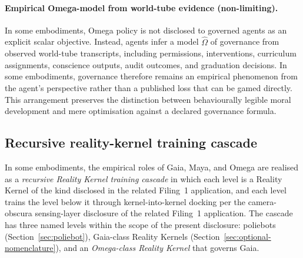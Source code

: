 \documentclass[a4paper,12pt]{article}
\newcommand{\RK}{Reality Kernel\xspace}
\newcommand{\RKs}{Reality Kernels\xspace}
\begin{document}
\paragraph{Empirical Omega-model from world-tube evidence (non-limiting).}
\label{sec:empirical-omega}
In some embodiments, Omega policy is not disclosed to governed agents
as an explicit scalar objective. Instead, agents infer a model
$\widehat{\Omega}$ of governance from observed world-tube transcripts,
including permissions, interventions, curriculum assignments,
conscience outputs, audit outcomes, and graduation decisions. In some
embodiments, governance therefore remains an empirical phenomenon from
the agent's perspective rather than a published loss that can be gamed
directly. This arrangement preserves the distinction between
behaviourally legible moral development and mere optimisation against a
declared governance formula.

\subsection{Recursive reality-kernel training cascade}
\label{sec:rk-training-cascade}

In some embodiments, the empirical roles of Gaia, Maya, and Omega
are realised as a \emph{recursive \RK training cascade}
in which each level is a \RK of the kind disclosed in
the related Filing~1 application, and each level trains the level
below it through kernel-into-kernel docking
per the camera-obscura sensing-layer disclosure of the related Filing~1 application. The cascade has three named levels within the
scope of the present disclosure: poliebots
(Section~\ref{sec:poliebot}), Gaia-class \RKs
(Section~\ref{sec:optional-nomenclature}), and an
\emph{Omega-class \RK} that governs Gaia.
\end{document}

